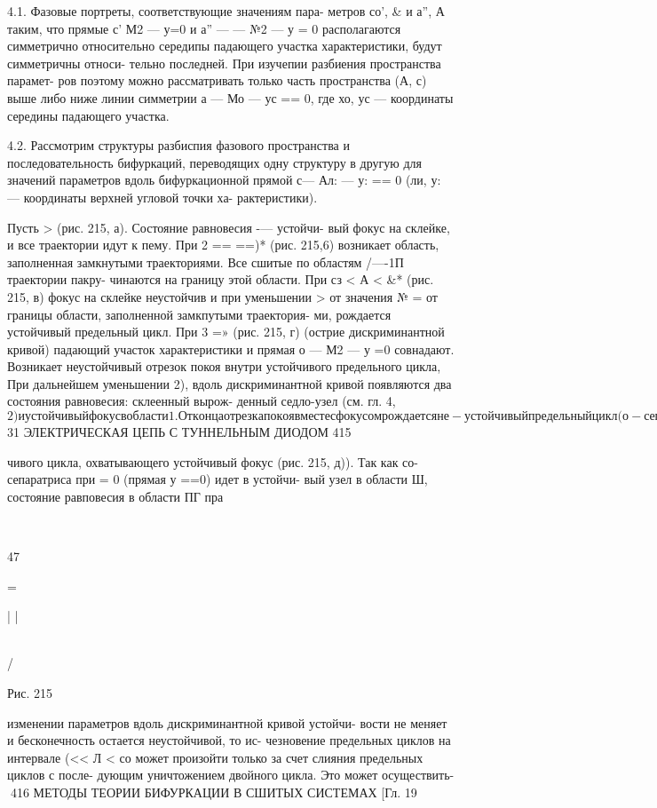 \documentclass{article}
\begin{document}
4.1. Фазовые портреты, соответствующие значениям пара-
метров со’, & и а”, А таким, что прямые с’ М2 — у=0 и а” —
— №2 — у = 0 располагаются симметрично относительно середипы
падающего участка характеристики, будут симметричны относи-
тельно последней. При изучепии разбиения пространства парамет-
ров поэтому можно рассматривать только часть пространства
(А, с) выше либо ниже линии симметрии а — Мо — ус == 0, где хо,
ус — координаты середины падающего участка.

4.2. Рассмотрим структуры разбиспия фазового пространства
и последовательность бифуркаций, переводящих одну структуру в
другую для значений параметров вдоль бифуркационной прямой
с— Ал: — у: == 0 (ли, у: — координаты верхней угловой точки ха-
рактеристики).

Пусть > \* (рис. 215, а). Состояние равновесия -— устойчи-
вый фокус на склейке, и все траектории идут к пему. При 2 ==
==)* (рис. 215,6) возникает область, заполненная замкнутыми
траекториями. Все сшитые по областям /—-1П траектории пакру-
чинаются на границу этой области. При сз < А < &* (рис. 215, в)
фокус на склейке неустойчив и при уменьшении > от значения
№ = \* от границы области, заполненной замкпутыми траектория-
ми, рождается устойчивый предельный цикл. При 3 =»
(рис. 215, г) (острие дискриминантной кривой) падающий участок
характеристики и прямая о — М2 — у =0 совнадают. Возникает
неустойчивый отрезок покоя внутри устойчивого предельного
цикла, При дальнейшем уменьшении 2), вдоль дискриминантной
кривой появляются два состояния равновесия: склеенный вырож-
денный седло-узел (см. гл. 4, $ 2) и устойчивый фокус в области
1. От конца отрезка покоя вместе с фокусом рождается не-
устойчивый предельный цикл (о-сепаратриса вырождепного со-
стояния равновесия идет к устойчивому циклу, охватывающему
все состояния равновесия, о-сепаратриса скручивается © неустой+
$ 31 ЭЛЕКТРИЧЕСКАЯ ЦЕПЬ С ТУННЕЛЬНЫМ ДИОДОМ 415

чивого цикла, охватывающего устойчивый фокус (рис. 215, д)).
Так как со-сепаратриса при = 0 (прямая у ==0) идет в устойчи-
вый узел в области Ш, состояние равповесия в области ПГ пра

\

47

=

|
|

\
\\

/

Рис. 215

изменении параметров вдоль дискриминантной кривой устойчи-
вости не меняет и бесконечность остается неустойчивой, то ис-
чезновение предельных циклов на интервале (<< Л < со может
произойти только за счет слияния предельных циклов с после-
дующим уничтожением двойного цикла. Это может осуществить-
416 МЕТОДЫ ТЕОРИИ БИФУРКАЦИИ В СШИТЫХ СИСТЕМАХ [Гл. 19
\end{document}
